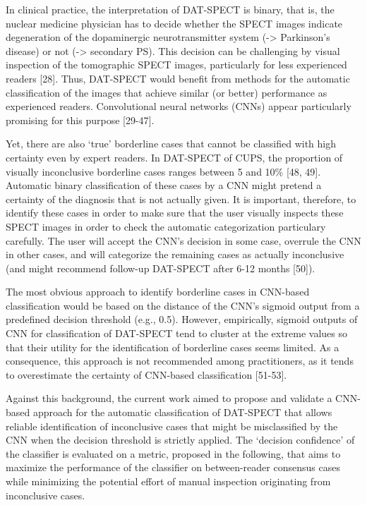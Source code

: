 In clinical practice, the interpretation of DAT-SPECT is binary, that is, the nuclear medicine physician has to decide whether the SPECT images 
indicate degeneration of the dopaminergic neurotransmitter system (-> Parkinson's disease) or not (-> secondary PS). 
This decision can be challenging by visual inspection of the tomographic SPECT images, particularly for less experienced readers [28]. 
Thus, DAT-SPECT would benefit from methods for the automatic classification of the images that achieve similar (or better) performance as experienced readers. 
Convolutional neural networks (CNNs) appear particularly promising for this purpose [29-47].

Yet, there are also `true' borderline cases that cannot be classified with high certainty even by expert readers. 
In DAT-SPECT of CUPS, the proportion of visually inconclusive borderline cases ranges between 5 and 10\% [48, 49]. 
Automatic binary classification of these cases by a CNN might pretend a certainty of the diagnosis that is not actually given. 
It is important, therefore, to identify these cases in order to make sure that the user visually inspects these SPECT images 
in order to check the automatic categorization particulary carefully. 
The user will accept the CNN's decision in some case, overrule the CNN in other cases, and will categorize the remaining cases as 
actually inconclusive (and might recommend follow-up DAT-SPECT after 6-12 months [50]). 

The most obvious approach to identify borderline cases in CNN-based classification would be based on the distance of the CNN's sigmoid output from a predefined decision threshold (e.g., 0.5). 
However, empirically, sigmoid outputs of CNN for classification of DAT-SPECT tend to cluster at the extreme values so that their utility for the identification of borderline cases seems limited.  
As a consequence, this approach is not recommended among practitioners, as it tends to overestimate the certainty of CNN-based classification [51-53].


Against this background, the current work aimed to propose and validate a CNN-based approach for the automatic classification of DAT-SPECT 
that allows reliable identification of inconclusive cases that might be misclassified by the CNN when the decision threshold is strictly applied.
The `decision confidence' of the classifier is evaluated on a metric, proposed in the following, that aims to maximize the performance of the classifier
on between-reader consensus cases while minimizing the potential effort of manual inspection originating from inconclusive cases.

